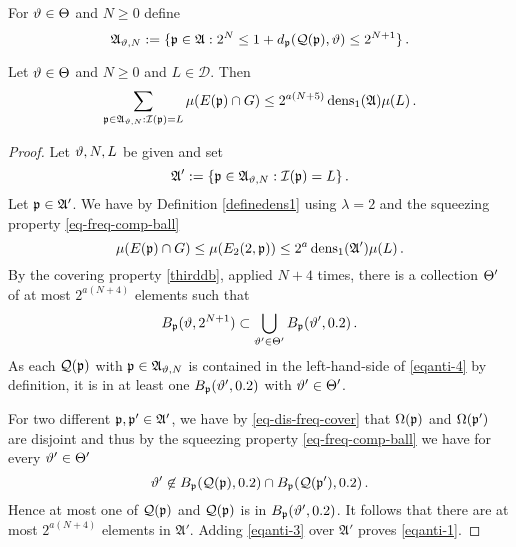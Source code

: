 {For ${\vartheta} \in {\Theta}$ and $N\ge 0$ define
\begin{equation}\label{eqantidefap}
    \mathfrak{A}_{{\vartheta},N}:=\{{\mathfrak p}\in\mathfrak{A}: 2^{N}\le 1+d_{{\mathfrak p}}({\mathcal{Q}}({\mathfrak p}), {\vartheta})\le 2^{N+1}\} \, .
\end{equation}


\begin{lemma}
\label{stack-density}
Let ${\vartheta} \in {\Theta}$ and $N\ge 0$ and
$L\in \mathcal{D}$. Then
\begin{equation}\label{eqanti-1}
    \sum_{{\mathfrak p}\in\mathfrak{A}_{{\vartheta},N}:{\mathcal{I}}({\mathfrak p})=L}\mu(E({\mathfrak p})\cap G)\le  2^{a(N+5)}\operatorname{\operatorname{dens}}_1(\mathfrak{A})\mu(L)\, .
\end{equation}
\end{lemma}
\begin{proof}
Let ${\vartheta},N,L$ be given and set
\begin{equation}
\mathfrak{A}':=\{{\mathfrak p}\in\mathfrak{A}_{{\vartheta},N}:{\mathcal{I}}({\mathfrak p})=L\}\, .
\end{equation}
Let
${\mathfrak p}\in\mathfrak{A}'$.
We have
by Definition \eqref{definedens1}
using $\lambda=2$ and the squeezing property \eqref{eq-freq-comp-ball}
\begin{equation}\label{eqanti-3}
\mu(E({\mathfrak p})\cap G)\le \mu(E_2(2, {\mathfrak p}))\le 2^{a}\operatorname{\operatorname{dens}}_1(\mathfrak{A}')\mu(L)\, .
\end{equation}
By the covering property \eqref{thirddb}, applied $N+4$ times, there is a collection ${\Theta}'$ of at most $2^{a(N+4)}$
elements such that
\begin{equation}\label{eqanti-4}
    B_{{\mathfrak p}}({\vartheta}, 2^{N+1})\subset \bigcup_{{\vartheta}'\in {\Theta}'}
    B_{{\mathfrak p}}({\vartheta}', 0.2)\, .
\end{equation}
As each ${\mathcal{Q}}({\mathfrak p})$ with ${\mathfrak p}\in \mathfrak{A}_{{\vartheta},N}$
is contained in the left-hand-side
of \eqref{eqanti-4}
by definition, it is in  at least one $B_{{\mathfrak p}}({\vartheta}', 0.2)$
with ${\vartheta}'\in {\Theta}'$.


For two different ${\mathfrak p},{\mathfrak p}'\in \mathfrak{A}'$, we have by
\eqref{eq-dis-freq-cover} that
${\Omega}({\mathfrak p})$ and ${\Omega}({\mathfrak p}')$ are disjoint and thus by the squeezing property \eqref{eq-freq-comp-ball} we have for every ${\vartheta}'\in {\Theta}'$
\begin{equation}
    {\vartheta}'\not\in B_{{\mathfrak p}}({\mathcal{Q}}({\mathfrak p}), 0.2)\cap
B_{{\mathfrak p}}({\mathcal{Q}}({\mathfrak p}'), 0.2)\, .
\end{equation}
Hence at most one of ${\mathcal{Q}}({\mathfrak p})$
and ${\mathcal{Q}}({\mathfrak p})$ is in
$B_{{\mathfrak p}}({\vartheta}', 0.2)$.
It follows that there are at most $2^{a(N+4)}$ elements in
$\mathfrak{A}'$. Adding \eqref{eqanti-3} over $\mathfrak{A}'$ proves
\eqref{eqanti-1}.



\end{proof}}

